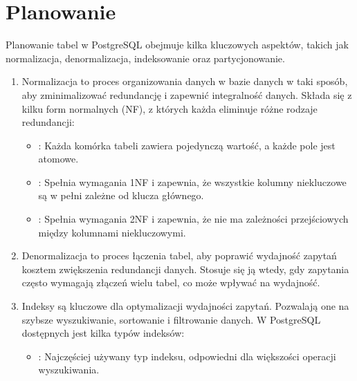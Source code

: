 \documentclass[letterpaper,10pt,polish]{sphinxmanual}
\begin{document}
\section{Planowanie}
\label{\detokenize{DB-Konfiguracja-bazy-danych/source/rozdzialy/rozdzial2:planowanie}}
\sphinxAtStartPar
Planowanie tabel w PostgreSQL obejmuje kilka kluczowych aspektów, takich jak normalizacja, denormalizacja, indeksowanie oraz partycjonowanie.
\begin{enumerate}
%
\item {} 
\sphinxAtStartPar
{} \sphinxhyphen{} Normalizacja to proces organizowania danych w bazie danych w taki sposób, aby zminimalizować redundancję i zapewnić integralność danych. Składa się z kilku form normalnych (NF), z których każda eliminuje różne rodzaje redundancji:
\begin{itemize}
\item {} 
\sphinxAtStartPar
{}: Każda komórka tabeli zawiera pojedynczą wartość, a każde pole jest atomowe.

\item {} 
\sphinxAtStartPar
{}: Spełnia wymagania 1NF i zapewnia, że wszystkie kolumny niekluczowe są w pełni zależne od klucza głównego.

\item {} 
\sphinxAtStartPar
{}: Spełnia wymagania 2NF i zapewnia, że nie ma zależności przejściowych między kolumnami niekluczowymi.

\end{itemize}

\item {} 
\sphinxAtStartPar
{} \sphinxhyphen{} Denormalizacja to proces łączenia tabel, aby poprawić wydajność zapytań kosztem zwiększenia redundancji danych. Stosuje się ją wtedy, gdy zapytania często wymagają złączeń wielu tabel, co może wpływać na wydajność.

\item {} 
\sphinxAtStartPar
{} \sphinxhyphen{} Indeksy są kluczowe dla optymalizacji wydajności zapytań. Pozwalają one na szybsze wyszukiwanie, sortowanie i filtrowanie danych. W PostgreSQL dostępnych jest kilka typów indeksów:
\begin{itemize}
\item {} 
\sphinxAtStartPar
{}: Najczęściej używany typ indeksu, odpowiedni dla większości operacji wyszukiwania.


\end{itemize}
\end{enumerate}
\end{document}
